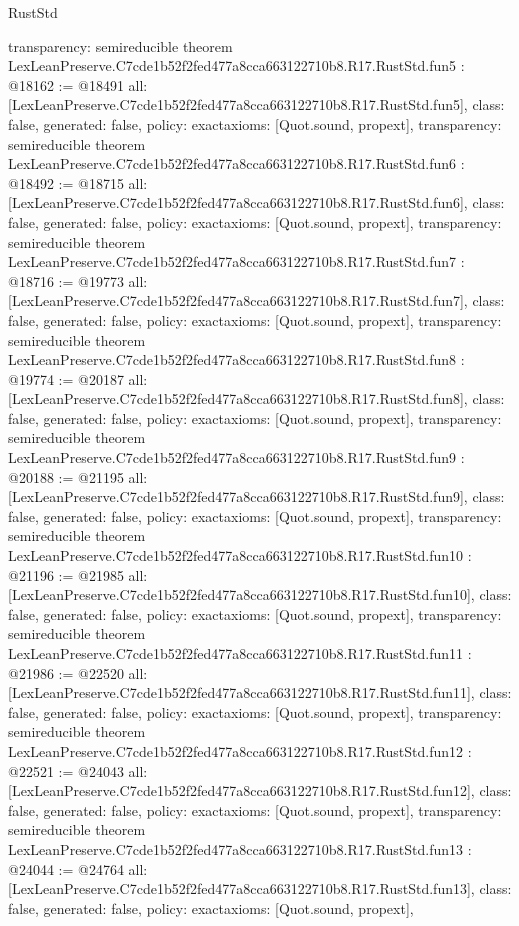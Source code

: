 \begin{lexlean}{RustStd}
\begin{coremodule}
{  transparency: semireducible
}
theorem LexLeanPreserve.C7cde1b52f2fed477a8cca663122710b8.R17.RustStd.fun5 : @18162 := @18491 {
  all: [LexLeanPreserve.C7cde1b52f2fed477a8cca663122710b8.R17.RustStd.fun5],
  class: false,
  generated: false,
  policy: exact{axioms: [Quot.sound, propext]},
  transparency: semireducible
}
theorem LexLeanPreserve.C7cde1b52f2fed477a8cca663122710b8.R17.RustStd.fun6 : @18492 := @18715 {
  all: [LexLeanPreserve.C7cde1b52f2fed477a8cca663122710b8.R17.RustStd.fun6],
  class: false,
  generated: false,
  policy: exact{axioms: [Quot.sound, propext]},
  transparency: semireducible
}
theorem LexLeanPreserve.C7cde1b52f2fed477a8cca663122710b8.R17.RustStd.fun7 : @18716 := @19773 {
  all: [LexLeanPreserve.C7cde1b52f2fed477a8cca663122710b8.R17.RustStd.fun7],
  class: false,
  generated: false,
  policy: exact{axioms: [Quot.sound, propext]},
  transparency: semireducible
}
theorem LexLeanPreserve.C7cde1b52f2fed477a8cca663122710b8.R17.RustStd.fun8 : @19774 := @20187 {
  all: [LexLeanPreserve.C7cde1b52f2fed477a8cca663122710b8.R17.RustStd.fun8],
  class: false,
  generated: false,
  policy: exact{axioms: [Quot.sound, propext]},
  transparency: semireducible
}
theorem LexLeanPreserve.C7cde1b52f2fed477a8cca663122710b8.R17.RustStd.fun9 : @20188 := @21195 {
  all: [LexLeanPreserve.C7cde1b52f2fed477a8cca663122710b8.R17.RustStd.fun9],
  class: false,
  generated: false,
  policy: exact{axioms: [Quot.sound, propext]},
  transparency: semireducible
}
theorem LexLeanPreserve.C7cde1b52f2fed477a8cca663122710b8.R17.RustStd.fun10 : @21196 := @21985 {
  all: [LexLeanPreserve.C7cde1b52f2fed477a8cca663122710b8.R17.RustStd.fun10],
  class: false,
  generated: false,
  policy: exact{axioms: [Quot.sound, propext]},
  transparency: semireducible
}
theorem LexLeanPreserve.C7cde1b52f2fed477a8cca663122710b8.R17.RustStd.fun11 : @21986 := @22520 {
  all: [LexLeanPreserve.C7cde1b52f2fed477a8cca663122710b8.R17.RustStd.fun11],
  class: false,
  generated: false,
  policy: exact{axioms: [Quot.sound, propext]},
  transparency: semireducible
}
theorem LexLeanPreserve.C7cde1b52f2fed477a8cca663122710b8.R17.RustStd.fun12 : @22521 := @24043 {
  all: [LexLeanPreserve.C7cde1b52f2fed477a8cca663122710b8.R17.RustStd.fun12],
  class: false,
  generated: false,
  policy: exact{axioms: [Quot.sound, propext]},
  transparency: semireducible
}
theorem LexLeanPreserve.C7cde1b52f2fed477a8cca663122710b8.R17.RustStd.fun13 : @24044 := @24764 {
  all: [LexLeanPreserve.C7cde1b52f2fed477a8cca663122710b8.R17.RustStd.fun13],
  class: false,
  generated: false,
  policy: exact{axioms: [Quot.sound, propext]},
}
\end{coremodule}
\end{lexlean}
